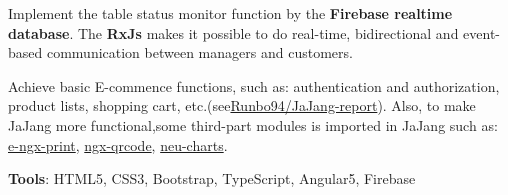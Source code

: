 \documentclass[letterpaper]{deedy-resume} %
\begin{document}
\begin{minipage}[t]{0.66\textwidth}
\vspace{\topsep} %
\begin{tightitemize}
	\item Implement the table status monitor function by the \textbf{Firebase realtime database}. The \textbf{RxJs} makes it possible to do real-time, bidirectional and event-based communication between managers and customers.
	\item Achieve basic E-commence functions, such as: authentication and authorization, product lists, shopping cart, etc.(see\href{https://github.com/Runbo94/JaJang-report}{Runbo94/JaJang-report}). Also, to make JaJang more functional,some third-part modules is imported in JaJang such as: \href{https://github.com/laixiangran/e-ngx-print}{e-ngx-print}, \href{https://github.com/nacardin/ngx-qrcode}{ngx-qrcode},
	\href{https://www.npmjs.com/package/neu-charts}{neu-charts}.
	\item \textbf{Tools}: HTML5, CSS3, Bootstrap, TypeScript, Angular5, Firebase
\end{tightitemize}








\end{minipage}
\end{document}
